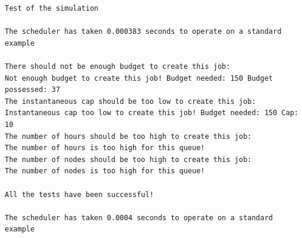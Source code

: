 \documentclass [10 pt, a4 paper]{report}
\begin{document}
\begin{lstlisting}[caption=Output of the simulation once it is finished, label={lst:code1}, frame=single]
Test of the simulation

The scheduler has taken 0.000383 seconds to operate on a standard example

There should not be enough budget to create this job:
Not enough budget to create this job! Budget needed: 150 Budget possessed: 37
The instantaneous cap should be too low to create this job:
Instantaneous cap too low to create this job! Budget needed: 150 Cap: 10
The number of hours should be too high to create this job:
The number of hours is too high for this queue!
The number of nodes should be too high to create this job:
The number of nodes is too high for this queue!

All the tests have been successful!

The scheduler has taken 0.0004 seconds to operate on a standard example
\end{lstlisting}






% 
\end{document}
